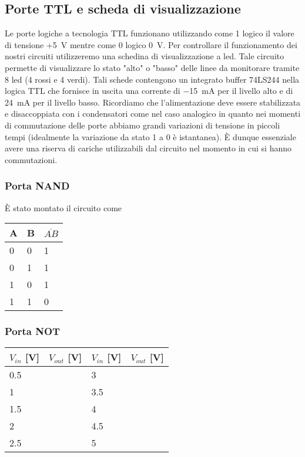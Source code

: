 \subsection{Porte TTL e scheda di visualizzazione}
Le porte logiche a tecnologia TTL funzionano utilizzando come 1 logico il valore di tensione +\SI{5}{\volt} mentre come 0 logico \SI{0}{\volt}. Per controllare il funzionamento dei nostri circuiti utilizzeremo una schedina di visualizzazione a led. Tale circuito permette di visualizzare lo stato "alto" o "basso" delle linee da monitorare tramite 8 led (4 rossi e 4 verdi). Tali schede contengono un integrato buffer 74LS244 nella logica TTL che fornisce in uscita una corrente di \SI{-15}{\milli\ampere} per il livello alto e di \SI{24}{\milli\ampere} per il livello basso.
Ricordiamo che l'alimentazione deve essere stabilizzata e disaccoppiata con i condensatori come nel caso analogico in quanto nei momenti di commutazione delle porte abbiamo grandi variazioni di tensione in piccoli tempi (idealmente la variazione da stato 1 a 0 è istantanea). È dunque essenziale avere una riserva di cariche utilizzabili dal circuito nel momento in cui si hanno commutazioni.

\subsubsection{Porta NAND}


È stato montato il circuito come 


\begin{tabular}{|l|l|l|}
\hline
A & B & $\overline{AB}$ \\
\hline
0 & 0 & 1\\
\hline
0 & 1 & 1\\
\hline
1 & 0 & 1\\
\hline
1 & 1 & 0\\
\hline
\end{tabular}

\subsubsection{Porta NOT}


\begin{tabular}{|l|l|||l|l|}
\hline
$V_{in}$ [\si{\volt}] & $V_{out}$ [\si{\volt}] & $V_{in}$ [\si{\volt}]& $V_{out}$ [\si{\volt}]\\
\hline
0.5 &  & 3 &  \\
\hline
1 &  & 3.5 &  \\
\hline
1.5 &  & 4 &  \\
\hline
2 &  & 4.5 &  \\
\hline
2.5 &  & 5 &  \\
\hline
\end{tabular}


